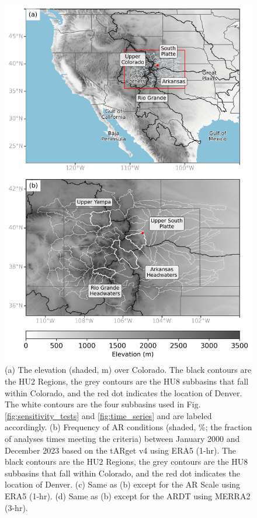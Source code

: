 \documentclass[draft]{agujournal2019}
\begin{document}
\begin{figure}
\noindent\includegraphics[width=\textwidth, height=\textheight, keepaspectratio]{fig1.png}
\caption{(a) The elevation (shaded, m) over Colorado. The black contours are the HU2 Regions, the grey contours are the HU8 subbasins that fall within Colorado, and the red dot indicates the location of Denver. The white contours are the four subbasins used in Fig. \ref{fig:sensitivity_tests} and \ref{fig:time_series} and are labeled accordingly. (b) Frequency of AR conditions (shaded, \%; the fraction of analyses times meeting the criteria) between January 2000 and December 2023 based on the  tARget v4 using ERA5 (1-hr). The black contours are the HU2 Regions, the grey contours are the HU8 subbasins that fall within Colorado, and the red dot indicates the location of Denver. (c) Same as (b) except for the AR Scale \cite{MartinRalph2019} using ERA5 (1-hr). (d) Same as (b) except for the  ARDT using MERRA2 (3-hr). }
\label{fig:ar_overhead}
\end{figure}
\end{document}

